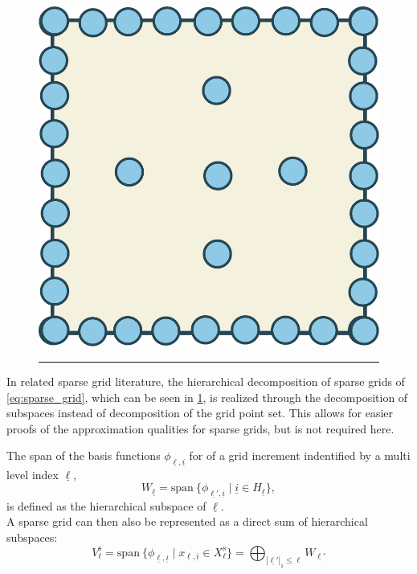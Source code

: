 \documentclass[
  a4paper,  %
  twoside,  %
  bibliography=totoc,
  headsepline,
  cleardoublepage=empty,
  parskip=half,
  draft=false
]{scrbook}
\newcommand{\delimit}{{\color{charcoal}\noindent\rule{\textwidth}{1pt}}}
\begin{document}
\begin{mdframed}[style=style]
\begin{figure}[H]
\begin{minipage}{0.26\textwidth}
  \includegraphics[width=.8\linewidth]{graphics/sparse_grid}
    \end{minipage}
    
\vspace{2.5mm}
\delimit

\label{fig:grid_construction}
\end{figure}
\end{mdframed}

In related sparse grid literature, the hierarchical decomposition of sparse grids of \cref{eq:sparse_grid}, which can be seen in \cref{fig:grid_construction}, is realized through the decomposition of subspaces instead of decomposition of the grid point set.
This allows for easier proofs of the approximation qualities for sparse grids, but is not required here.

\begin{definition}
The span of the basis functions $\phi_{\underline{\ell},\underline{i}}$ for of a grid increment indentified by a multi level index $\underline{\ell}$,
\begin{equation}
W_{\underline{\ell}}=\text{span}~ \{\phi_{\underline{\ell'},\underline{i}} \mid \underline{i} \in H_{\underline{\ell}}\},
\end{equation}
is defined as the hierarchical subspace of $\underline{\ell}$.\\
A sparse grid can then also be represented as a direct sum of hierarchical subspaces:
\begin{equation}
V^{\text{s}}_{\ell}=\text{span}~ \{\phi_{\underline{\ell},\underline{i}} \mid x_{\underline{\ell},\underline{i}} \in X^{\text{s}}_{\ell}\}=\bigoplus_{|\underline{\ell'}|_1 \leq \ell} W_{\underline{\ell'}}
\label{eq:direct_sum}
\end{equation}
\end{definition}
\end{document}
